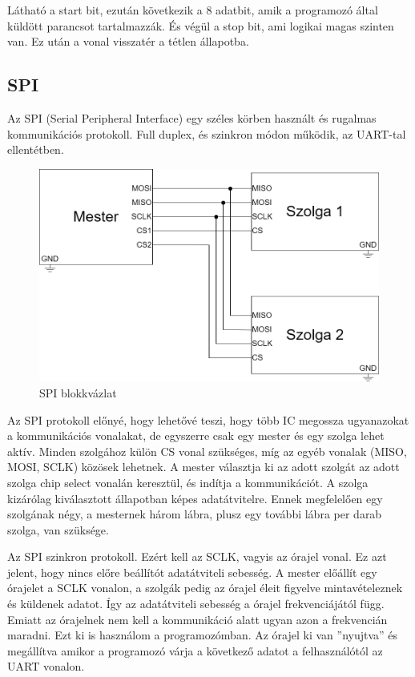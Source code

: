 \documentclass[a4paper,12pt,oneside]{book}
\begin{document}
Látható a start bit, ezután következik a 8 adatbit, amik a programozó által küldött parancsot tartalmazzák. És végül a stop bit, ami logikai magas szinten van. Ez után a vonal visszatér a tétlen állapotba.%

\subsection{SPI}
Az SPI (Serial Peripheral Interface) egy széles körben használt és rugalmas kommunikációs protokoll. Full duplex, és szinkron módon működik, az UART-tal ellentétben.%
\begin{figure}[H]
	\centering
	\includegraphics[trim=1mm 1mm 1mm 1mm,scale=0.45]{SPIblockk.PNG}
	\caption{SPI blokkvázlat}
	\label{SPI blokkvázlat}
\end{figure}
Az SPI protokoll előnyé, hogy lehetővé teszi, hogy több IC megossza ugyanazokat a kommunikációs vonalakat, de egyszerre csak egy mester és egy szolga lehet aktív. Minden szolgához külön CS vonal szükséges, míg az egyéb vonalak (MISO, MOSI, SCLK) közösek lehetnek. A mester választja ki az adott szolgát az adott szolga chip select vonalán keresztül, és indítja a kommunikációt. A szolga kizárólag kiválasztott állapotban képes adatátvitelre. Ennek megfelelően egy szolgának négy, a mesternek három lábra, plusz egy további lábra per darab szolga, van szüksége.%


Az SPI szinkron protokoll. Ezért kell az SCLK, vagyis az órajel vonal.  Ez azt jelent, hogy nincs előre beállítót adatátviteli sebesség. A mester előállít egy órajelet a SCLK vonalon, a szolgák pedig az órajel éleit figyelve mintavételeznek és küldenek adatot. Így az adatátviteli sebesség a órajel frekvenciájától függ. Emiatt az órajelnek nem kell a kommunikáció alatt ugyan azon a frekvencián maradni. Ezt ki is használom a programozómban. Az órajel ki van ”nyujtva” és megállítva amikor a programozó várja a következő adatot a felhasználótól az UART vonalon.%
\end{document}
